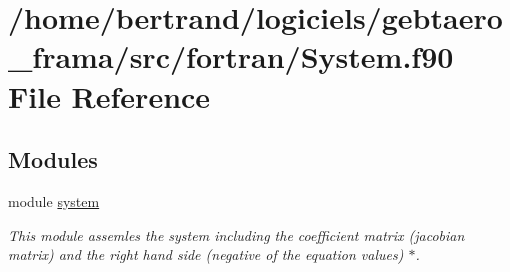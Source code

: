\hypertarget{_system_8f90}{}\section{/home/bertrand/logiciels/gebtaero\+\_\+frama/src/fortran/\+System.f90 File Reference}
\label{_system_8f90}
\subsection*{Modules}
\begin{DoxyCompactItemize}
\item 
module \hyperlink{namespacesystem}{system}
\begin{DoxyCompactList}\small\item\em This module assemles the system including the coefficient matrix (jacobian matrix) and the right hand side (negative of the equation values) $\ast$. \end{DoxyCompactList}\end{DoxyCompactItemize}
